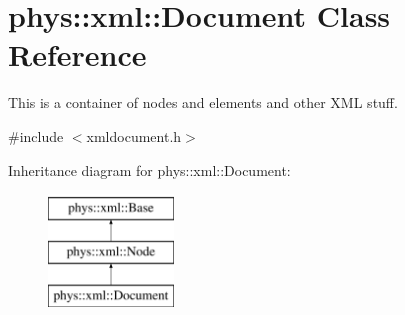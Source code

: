 \hypertarget{classphys_1_1xml_1_1Document}{
\section{phys::xml::Document Class Reference}
\label{dd/d44/classphys_1_1xml_1_1Document}
}


This is a container of nodes and elements and other XML stuff.  




{\ttfamily \#include $<$xmldocument.h$>$}

Inheritance diagram for phys::xml::Document:\begin{figure}[H]
\begin{center}
\leavevmode
\includegraphics[height=3.000000cm]{dd/d44/classphys_1_1xml_1_1Document}
\end{center}
\end{figure}
